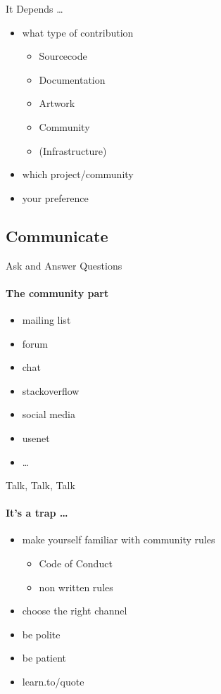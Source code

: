 \documentclass{beamer}
\begin{document}
\begin{frame}{It Depends \dots}
    \begin{itemize}
        \item what type of contribution
            \begin{itemize}
                \item Sourcecode
                \item Documentation
                \item Artwork
                \item Community
                \item (Infrastructure)
            \end{itemize}
        \item which project/community
        \item your preference
    \end{itemize}
\end{frame}

\subsection{Communicate}

\begin{frame}{Ask and Answer Questions}
    \framesubtitle{The community part}
    \begin{itemize}
        \item mailing list
        \item forum
        \item chat
        \item stackoverflow
        \item social media
        \item usenet
        \item \dots
    \end{itemize}
\end{frame}

\begin{frame}{Talk, Talk, Talk}
    \framesubtitle{It's a trap \dots}
    \begin{itemize}
        \item make yourself familiar with community rules
            \begin{itemize}
                \item Code of Conduct
                \item non written rules
            \end{itemize}
        \item choose the right channel
        \item be polite
        \item be patient
        \item learn.to/quote
    \end{itemize}
\end{frame}
\end{document}
